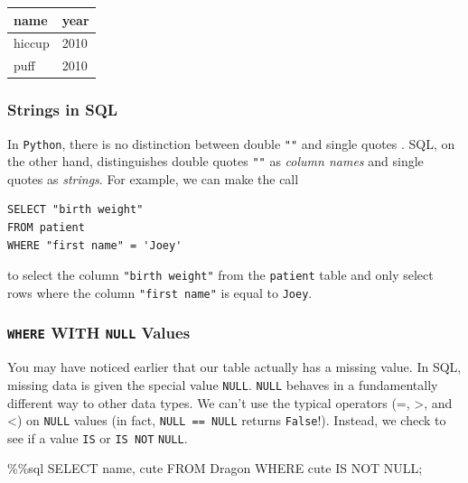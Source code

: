 \documentclass[
  letterpaper,
  DIV=11,
  numbers=noendperiod]{scrreprt}
\newenvironment{Shaded}{\begin{snugshade}}{\end{snugshade}}
\newcommand{\NormalTok}[1]{\textcolor[rgb]{0.00,0.23,0.31}{#1}}
\newcommand{\OperatorTok}[1]{\textcolor[rgb]{0.37,0.37,0.37}{#1}}
\begin{document}
\begin{longtable}[]{@{}ll@{}}
\toprule\noalign{}
name & year \\
\midrule\noalign{}
\endhead
\bottomrule\noalign{}
\endlastfoot
hiccup & 2010 \\
puff & 2010 \\
\end{longtable}

\subsubsection{Strings in SQL}\label{strings-in-sql}

In \texttt{Python}, there is no distinction between double \texttt{""}
and single quotes \texttt{\textquotesingle{}\textquotesingle{}}. SQL, on
the other hand, distinguishes double quotes \texttt{""} as \emph{column
names} and single quotes \texttt{\textquotesingle{}\textquotesingle{}}
as \emph{strings}. For example, we can make the call

\begin{verbatim}
SELECT "birth weight"
FROM patient
WHERE "first name" = 'Joey'
\end{verbatim}

to select the column \texttt{"birth\ weight"} from the \texttt{patient}
table and only select rows where the column \texttt{"first\ name"} is
equal to \texttt{\textquotesingle{}Joey\textquotesingle{}}.

\subsubsection{\texorpdfstring{\texttt{WHERE} WITH \texttt{NULL}
Values}{WHERE WITH NULL Values}}\label{where-with-null-values}

You may have noticed earlier that our table actually has a missing
value. In SQL, missing data is given the special value \texttt{NULL}.
\texttt{NULL} behaves in a fundamentally different way to other data
types. We can't use the typical operators (=, \textgreater, and
\textless) on \texttt{NULL} values (in fact, \texttt{NULL\ ==\ NULL}
returns \texttt{False}!). Instead, we check to see if a value
\texttt{IS} or \texttt{IS\ NOT} \texttt{NULL}.

\begin{Shaded}
\begin{Highlighting}[]
\OperatorTok{\%\%}\NormalTok{sql}
\NormalTok{SELECT name, cute}
\NormalTok{FROM Dragon}
\NormalTok{WHERE cute IS NOT NULL}\OperatorTok{;}
\end{Highlighting}
\end{Shaded}
\end{document}
